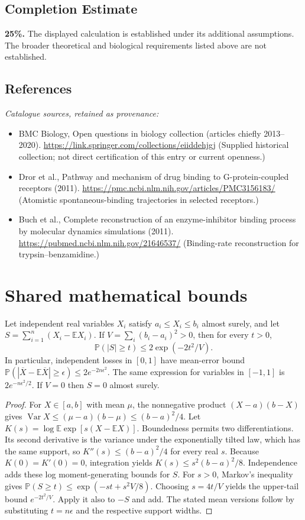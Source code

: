 \documentclass[11pt]{article}
\begin{document}
\subsection{Completion Estimate}
\textbf{25\%.} The displayed calculation is established under its additional assumptions. The broader theoretical and biological requirements listed above are not established.
\subsection{References}
\noindent\emph{Catalogue sources, retained as provenance:}
\begin{itemize}
\item BMC Biology, Open questions in biology collection (articles chiefly 2013--2020). \url{https://link.springer.com/collections/eiiddehjgj} (Supplied historical collection; not direct certification of this entry or current openness.)
\item Dror et al., Pathway and mechanism of drug binding to G-protein-coupled receptors (2011). \url{https://pmc.ncbi.nlm.nih.gov/articles/PMC3156183/} (Atomistic spontaneous-binding trajectories in selected receptors.)
\item Buch et al., Complete reconstruction of an enzyme-inhibitor binding process by molecular dynamics simulations (2011). \url{https://pubmed.ncbi.nlm.nih.gov/21646537/} (Binding-rate reconstruction for trypsin--benzamidine.)
\end{itemize}




\section{Shared mathematical bounds}\label{app:bounds}
\begin{lemma}\label{lem:bounded}
Let independent real variables $X_i$ satisfy $a_i\leq X_i\leq b_i$ almost surely,
and let $S=\sum_{i=1}^n(X_i-\mathbb{E} X_i)$. If
$V=\sum_i(b_i-a_i)^2>0$, then for every $t>0$,
\[
 \mathbb{P}(|S|\geq t)\leq 2\exp(-2t^2/V).
\]
In particular, independent losses in $[0,1]$ have mean-error bound
$\mathbb{P}(|\overline X-\mathbb{E}\overline X|\geq\epsilon)
\leq2e^{-2n\epsilon^2}$. The same expression for variables in $[-1,1]$
is $2e^{-n\epsilon^2/2}$. If $V=0$ then $S=0$ almost surely.
\end{lemma}
\begin{proof}
For $X\in[a,b]$ with mean $\mu$, the nonnegative product
$(X-a)(b-X)$ gives
$\operatorname{Var} X\leq(\mu-a)(b-\mu)\leq(b-a)^2/4$.
Let $K(s)=\log\mathbb{E}\exp[s(X-\mathbb{E} X)]$.
Boundedness permits two differentiations. Its second derivative is the variance
under the exponentially tilted law, which has the same support, so
$K''(s)\leq(b-a)^2/4$ for every real $s$.
Because $K(0)=K'(0)=0$, integration yields
$K(s)\leq s^2(b-a)^2/8$.
Independence adds these log moment-generating bounds for $S$.
For $s>0$, Markov's inequality gives
$\mathbb{P}(S\geq t)\leq\exp(-st+s^2V/8)$.
Choosing $s=4t/V$ yields the upper-tail bound $e^{-2t^2/V}$.
Apply it also to $-S$ and add. The stated mean versions follow by substituting
$t=n\epsilon$ and the respective support widths.
\end{proof}
\end{document}
